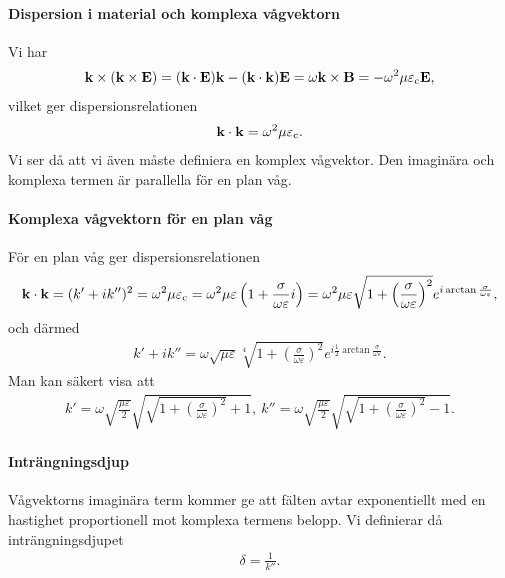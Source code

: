 \paragraph{Dispersion i material och komplexa vågvektorn}
Vi har
\begin{align*}
	\vb{k}\times(\vb{k}\times\vb{E}) = (\vb{k}\cdot\vb{E})\vb{k} - (\vb{k}\cdot\vb{k})\vb{E} = \omega\vb{k}\times\vb{B} = -\omega^{2}\mu\varepsilon_{\text{c}}\vb{E},
\end{align*}
vilket ger dispersionsrelationen
\begin{align*}
	\vb{k}\cdot\vb{k} = \omega^{2}\mu\varepsilon_{\text{c}}.
\end{align*}
Vi ser då att vi även måste definiera en komplex vågvektor. Den imaginära och komplexa termen är parallella för en plan våg.

\paragraph{Komplexa vågvektorn för en plan våg}
För en plan våg ger dispersionsrelationen
\begin{align*}
	\vb{k}\cdot\vb{k} = (k' + ik'')^{2} = \omega^{2}\mu\varepsilon_{\text{c}} = \omega^{2}\mu\varepsilon\left(1 + \frac{\sigma}{\omega\varepsilon}i\right) = \omega^{2}\mu\varepsilon\sqrt{1 + \left(\frac{\sigma}{\omega\varepsilon}\right)^{2}}e^{i\arctan{\frac{\sigma}{\omega\varepsilon}}},
\end{align*}
och därmed
\begin{align*}
	k' + ik'' = \omega\sqrt{\mu\varepsilon}\sqrt[4]{1 + \left(\frac{\sigma}{\omega\varepsilon}\right)^{2}}e^{i\frac{1}{2}\arctan{\frac{\sigma}{\omega\varepsilon}}}.
\end{align*}
Man kan säkert visa att
\begin{align*}
	k' = \omega\sqrt{\frac{\mu\varepsilon}{2}}\sqrt{\sqrt{1 + \left(\frac{\sigma}{\omega\varepsilon}\right)^{2}} + 1},\ k'' = \omega\sqrt{\frac{\mu\varepsilon}{2}}\sqrt{\sqrt{1 + \left(\frac{\sigma}{\omega\varepsilon}\right)^{2}} - 1}.
\end{align*}

\paragraph{Inträngningsdjup}
Vågvektorns imaginära term kommer ge att fälten avtar exponentiellt med en hastighet proportionell mot komplexa termens belopp. Vi definierar då inträngningsdjupet
\begin{align*}
	\delta = \frac{1}{k''}.
\end{align*}

